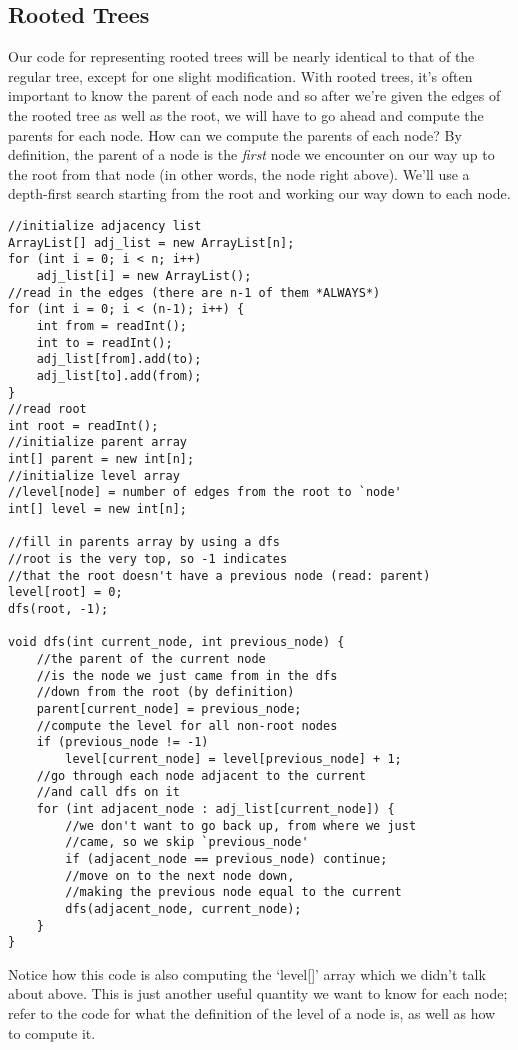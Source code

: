 \documentclass[11pt]{article}
\theoremstyle{plain}
\theoremstyle{definition}
\begin{document}
\subsection{Rooted Trees}
Our code for representing rooted trees will be nearly identical to that of the regular tree, except for one slight modification. With rooted trees, it's often important to know the parent of each node and so after we're given the edges of the rooted tree as well as the root, we will have to go ahead and compute the parents for each node. How can we compute the parents of each node? By definition, the parent of a node is the \emph{first} node we encounter on our way up to the root from that node (in other words, the node right above). We'll use a depth-first search starting from the root and working our way down to each node. 
\begin{lstlisting}
//initialize adjacency list
ArrayList[] adj_list = new ArrayList[n];
for (int i = 0; i < n; i++)
	adj_list[i] = new ArrayList();
//read in the edges (there are n-1 of them *ALWAYS*)
for (int i = 0; i < (n-1); i++) {
	int from = readInt();
	int to = readInt();
	adj_list[from].add(to);
	adj_list[to].add(from);
}
//read root
int root = readInt();
//initialize parent array
int[] parent = new int[n];
//initialize level array
//level[node] = number of edges from the root to `node'
int[] level = new int[n];

//fill in parents array by using a dfs
//root is the very top, so -1 indicates
//that the root doesn't have a previous node (read: parent)
level[root] = 0;
dfs(root, -1);

void dfs(int current_node, int previous_node) {
	//the parent of the current node
	//is the node we just came from in the dfs
	//down from the root (by definition)
	parent[current_node] = previous_node;
	//compute the level for all non-root nodes
	if (previous_node != -1)
		level[current_node] = level[previous_node] + 1;
	//go through each node adjacent to the current
	//and call dfs on it
	for (int adjacent_node : adj_list[current_node]) {
		//we don't want to go back up, from where we just
		//came, so we skip `previous_node'
		if (adjacent_node == previous_node) continue;
		//move on to the next node down,
		//making the previous node equal to the current
		dfs(adjacent_node, current_node);
	}
}
\end{lstlisting}
Notice how this code is also computing the `level[]' array which we didn't talk about above. This is just another useful quantity we want to know for each node; refer to the code for what the definition of the level of a node is, as well as how to compute it.
\end{document}
